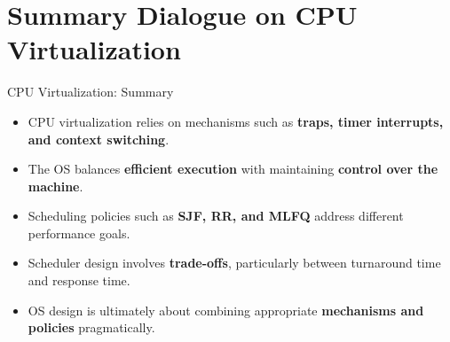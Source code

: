 \section{Summary Dialogue on CPU Virtualization}

\begin{frame}{CPU Virtualization: Summary}
    \begin{itemize}
        \item CPU virtualization relies on mechanisms such as
              \textbf{traps, timer interrupts, and context switching}.
        \item The OS balances \textbf{efficient execution} with maintaining
              \textbf{control over the machine}.
        \item Scheduling policies such as \textbf{SJF, RR, and MLFQ}
              address different performance goals.
        \item Scheduler design involves \textbf{trade-offs}, particularly
              between turnaround time and response time.
        \item OS design is ultimately about combining appropriate
              \textbf{mechanisms and policies} pragmatically.
    \end{itemize}
\end{frame}